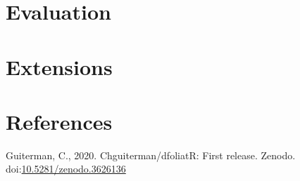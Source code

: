 \documentclass[review]{elsarticle} %
\begin{document}
\hypertarget{evaluation}{%
\section{Evaluation}\label{evaluation}}

\hypertarget{extensions}{%
\section{Extensions}\label{extensions}}

\hypertarget{references}{%
\section*{References}\label{references}}

\hypertarget{refs}{}
\leavevmode\hypertarget{ref-chris_guiterman_2020_3626136}{}%
Guiterman, C., 2020. Chguiterman/dfoliatR: First release. Zenodo.
doi:\href{https://doi.org/10.5281/zenodo.3626136}{10.5281/zenodo.3626136}
\end{document}
